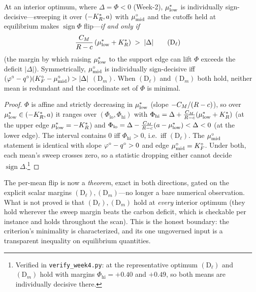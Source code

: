 \begin{theorem}\label{r1w4-thm:permean}
At an interior optimum, where $\Delta=\Phi<0$ (Week-2), $\mu^{*}_{\mathrm{low}}$ is individually
sign-decisive---sweeping it over $(-K_R^{*},a)$ with $\mu^{\circ}_{\mathrm{mid}}$ and the cutoffs held at
equilibrium makes $\operatorname{sign}\Phi$ flip---\emph{if and only if}
\[
  \frac{\CM}{R-c}\,(\mustar+\KRs)\;>\;|\Delta| \tag{$\mathrm{D}_{\ell}$}
\]
(the margin by which raising $\mu^{*}_{\mathrm{low}}$ to the support edge can lift $\Phi$ exceeds the
deficit $|\Delta|$). Symmetrically, $\mu^{\circ}_{\mathrm{mid}}$ is individually sign-decisive iff
$(\varphi^{\circ}-q^{\circ})(K_F^{\circ}-\mu^{\circ}_{\mathrm{mid}})>|\Delta|$ $(\mathrm{D}_m)$. When $(\mathrm{D}_\ell)$ and
$(\mathrm{D}_m)$ both hold, neither mean is redundant and the coordinate set of $\Phi$ is
minimal.
\end{theorem}
\begin{proof}
$\Phi$ is affine and strictly decreasing in $\mu^{*}_{\mathrm{low}}$ (slope $-C_M/(R-c)$), so over
$\mu^{*}_{\mathrm{low}}\in(-K_R^{*},a)$ it ranges over $(\Phi_{\mathrm{lo}},\Phi_{\mathrm{hi}})$ with
$\Phi_{\mathrm{hi}}=\Delta+\tfrac{C_M}{R-c}(\mu^{*}_{\mathrm{low}}+K_R^{*})$ (at the upper edge
$\mu^{*}_{\mathrm{low}}=-K_R^{*}$) and $\Phi_{\mathrm{lo}}=\Delta-\tfrac{C_M}{R-c}(a-\mu^{*}_{\mathrm{low}})<\Delta<0$
(at the lower edge). The interval contains $0$ iff $\Phi_{\mathrm{hi}}>0$, i.e.\ iff
$(\mathrm{D}_\ell)$. The $\mu^{\circ}_{\mathrm{mid}}$ statement is identical with slope $\varphi^{\circ}-q^{\circ}>0$ and edge
$\mu^{\circ}_{\mathrm{mid}}=K_F^{\circ}$. Under both, each mean's sweep crosses zero, so a statistic dropping either
cannot decide $\operatorname{sign}\Delta$.\footnote{Verified in \texttt{verify\_week4.py}:
at the representative optimum $(\mathrm{D}_\ell)$ and $(\mathrm{D}_m)$ hold with margins
$\Phi_{\mathrm{hi}}=+0.40$ and $+0.49$, so both means are individually decisive there.}
\end{proof}

\begin{remark}
The per-mean flip is now a \emph{theorem}, exact in both directions, gated on the explicit
scalar margins $(\mathrm{D}_\ell),(\mathrm{D}_m)$---no longer a bare numerical
observation. What is not proved is that $(\mathrm{D}_\ell),(\mathrm{D}_m)$ hold at
\emph{every} interior optimum (they hold wherever the sweep margin beats the carbon
deficit, which is checkable per instance and holds throughout the scan). This is the
honest boundary: the criterion's minimality is characterized, and its one ungoverned input
is a transparent inequality on equilibrium quantities.
\end{remark}

